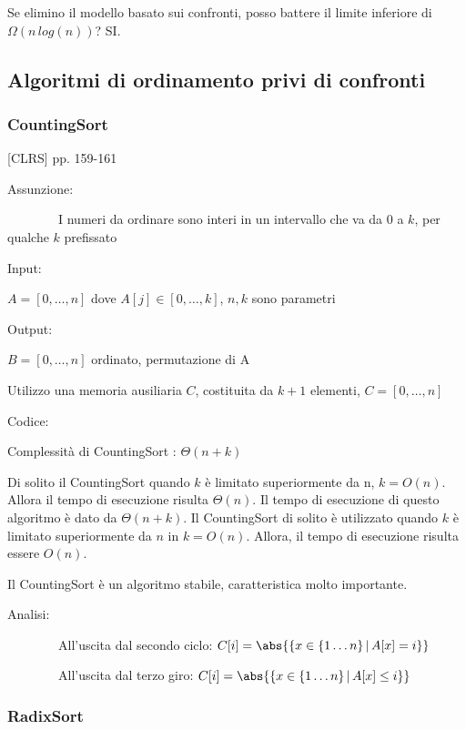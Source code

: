 \documentclass[tikz]{article}
\begin{document}
{Se elimino il modello basato sui confronti, posso battere il limite inferiore di $\Omega(n\,log(n))$? SI.}

\subsection{Algoritmi di ordinamento privi di confronti}

\subsubsection{CountingSort}

{{[}CLRS{]} pp. 159-161}

{Assunzione:}

{~~~~~~~~I numeri da ordinare sono interi in un intervallo che va da 0 a $k$, per qualche $k$ prefissato}

{Input:}

{$A=[0,\ldots,n]$ dove $A[j] \in [0,\ldots,k]$, $n,k$ sono parametri}

{Output:}

{$B=[0,\ldots,n]$ ordinato, permutazione di A}

{Utilizzo una memoria ausiliaria $C$, costituita da $k+1$ elementi, $C=[0,\ldots,n]$}

{Codice:}



{Complessità di CountingSort : $\Theta(n+k)$}

{Di solito il CountingSort quando $k$ è limitato superiormente da n, $k=O(n)$. Allora il tempo di esecuzione risulta $\Theta(n)$. Il tempo di esecuzione di questo algoritmo è dato da
$\Theta(n+k)$. Il CountingSort di solito è utilizzato quando $k$ è limitato superiormente da $n$ in $k=O(n)$. Allora, il tempo di esecuzione risulta essere $O(n)$.}

{Il CountingSort è un algoritmo stabile, caratteristica molto importante.}

{Analisi:}

{~~~~~~~~All'uscita dal secondo ciclo: $C[i] = \abs{\{x \in \{1\ldots n\}\,|\,A[x] = i\}}$}

{~~~~~~~~All'uscita dal terzo giro: $C[i] = \abs{\{x \in \{1\ldots n\}\,|\,A[x] \leq i\}}$}


\subsubsection{RadixSort}
\end{document}
